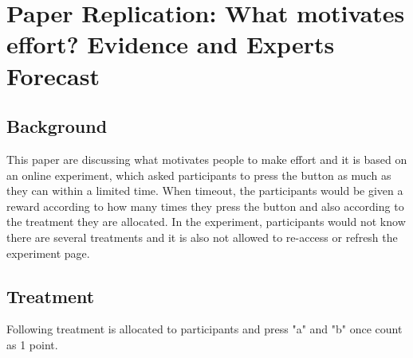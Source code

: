 \documentclass[11pt
]{article}
\author{Yu-Hsin CHEN}
\date{2023/3/25}
\begin{document}
\hypertarget{paper-replication}{%
\section{Paper Replication: What motivates effort? Evidence and Experts Forecast}\label{paper-replication}}

\hypertarget{background}{%
\subsection{Background}\label{background}}

This paper are discussing what motivates people to make effort and it is
based on an online experiment, which asked participants to press the
button as much as they can within a limited time. When timeout, the
participants would be given a reward according to how many times they press
the button and also according to the treatment they are allocated. In
the experiment, participants would not know there are several treatments
and it is also not allowed to re-access or refresh the experiment page.

\hypertarget{treatment}{%
\subsection{Treatment}\label{treatment}}

Following treatment is allocated to participants and press "a" and "b" once
count as 1 point.
\end{document}
